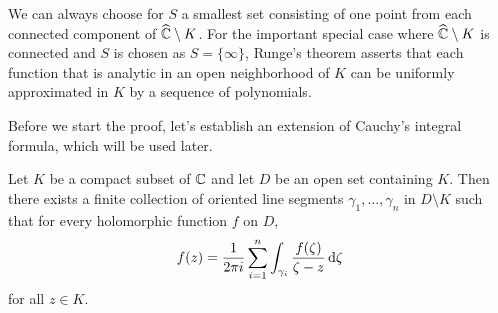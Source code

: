 We can always choose for $S$ a smallest set consisting of one point from each connected component of $\widehat{\mathbb{C}}\setminus K$. For the important special case where $\widehat{\mathbb{C}}\setminus K$ is connected and $S$ is chosen as $S=\{\infty\}$, Runge's theorem asserts that each function that is analytic in an open neighborhood of $K$ can be uniformly approximated in $K$ by a sequence of polynomials.\par
Before we start the proof, let's establish an extension of Cauchy's integral formula, which will be used later.
\begin{proposition}\label{cauchy integral formula extended form}
Let $K$ be a compact subset of $\mathbb{C}$ and let $D$ be an open set containing $K$. Then there exists a finite collection of oriented line segments $\gamma_1,\dots,\gamma_n$ in $D\setminus K$ such that for every holomorphic function $f$ on $D$,
\begin{align}\label{cauchy integral formula extended form-1}
f(z)=\frac{1}{2\pi i}\sum_{i=1}^{n}\int_{\gamma_i}\frac{f(\zeta)}{\zeta-z}\mathop{}\!\mathrm{d}\zeta
\end{align}
for all $z\in K$.
\end{proposition}
